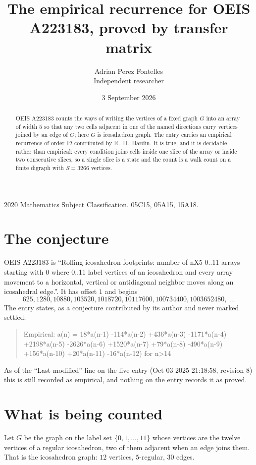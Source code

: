 \documentclass[11pt,a4paper]{article}
\title{The empirical recurrence for OEIS A223183, proved by transfer matrix}
\author{Adrian Perez Fontelles\\ \small Independent researcher}
\date{3 September 2026}
\theoremstyle{plain}
\theoremstyle{definition}
\begin{document}
\maketitle

\begin{abstract}
OEIS A223183 counts the ways of writing the vertices of a fixed graph $G$ into an array of width
$5$ so that any two cells adjacent in one of the named directions carry vertices joined by an
edge of $G$; here $G$ is icosahedron graph. The entry carries an empirical recurrence of order $12$
contributed by R.~H.~Hardin. It is true, and it is decidable rather than empirical: every
condition joins cells inside one slice of the array or inside two consecutive slices, so a
single slice is a state and the count is a walk count on a finite digraph with $S=3266$ vertices.
\end{abstract}

\noindent\small 2020 Mathematics Subject Classification. 05C15, 05A15, 15A18.\normalsize

\section{The conjecture}

OEIS A223183 is ``Rolling icosahedron footprints: number of nX5 0..11 arrays starting with 0 where 0..11 label vertices of an icosahedron and every array movement to a horizontal, vertical or antidiagonal neighbor moves along an icosahedral edge.''. It has offset $1$ and begins
\[
625, 1280, 10880, 103520, 1018720, 10117600, 100734400, 1003652480,\ \dots
\]
The entry states, as a conjecture contributed by its author and never marked settled:
\begin{quote}
Empirical: a(n) = 18*a(n-1) -114*a(n-2) +436*a(n-3) -1171*a(n-4) +2198*a(n-5) -2626*a(n-6) +1520*a(n-7) +79*a(n-8) -490*a(n-9) +156*a(n-10) +20*a(n-11) -16*a(n-12) for n>14
\end{quote}
As of the ``Last modified'' line on the live entry (Oct 03 2025 21:18:58, revision 8) this is still
recorded as empirical, and nothing on the entry records it as proved.

\section{What is being counted}

Let $G$ be the graph on the label set $\{0,1,\dots,11\}$ whose vertices are the twelve vertices of a regular icosahedron, two of them adjacent when an edge joins them. That is the icosahedron graph: $12$ vertices, $5$-regular, $30$ edges.
\end{document}
